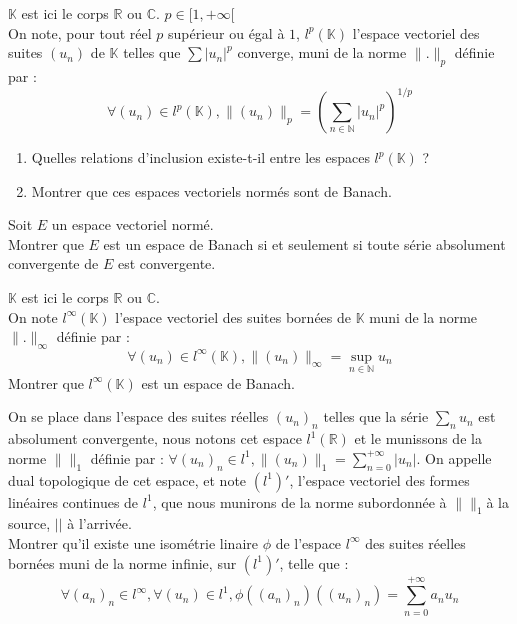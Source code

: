 \begin{exer}
$\mathbb{K}$ est ici le corps $\mathbb{R}$ ou $\mathbb{C}$. $p \in [1,+\infty[$\\
On note, pour tout réel $p$ supérieur ou égal à $1$, $l^{p}(\mathbb{K})$ l'espace vectoriel des suites $(u_n)$ de $\mathbb{K}$ %
telles que $\sum \lvert u_n \rvert^{p}$ converge, muni de la norme $\|.\|_{p}$ définie par :
\[\forall (u_n) \in l^{p}(\mathbb{K}) , \|(u_n)\|_{p} = (\sum_{n \in \mathbb{N}} \lvert u_n \rvert^{p})^{1/p}\]
\begin{enumerate}
\item Quelles relations d'inclusion existe-t-il entre les espaces $l^{p}(\mathbb{K})$ ?
\item Montrer que ces espaces vectoriels normés sont de Banach.
\end{enumerate}
\end{exer}

\begin{exer}
Soit $E$ un espace vectoriel normé.\\
Montrer que $E$ est un espace de Banach si et seulement si toute série absolument convergente de $E$ est convergente.
\end{exer}

\begin{exer}
$\mathbb{K}$ est ici le corps $\mathbb{R}$ ou $\mathbb{C}$.\\
On note $l^{\infty}(\mathbb{K})$ l'espace vectoriel des suites bornées de $\mathbb{K}$ muni de la norme %
$\|.\|_{\infty}$ définie par :
\[\forall (u_n) \in l^{\infty}(\mathbb{K}) , \|(u_n)\|_{\infty} = \sup_{n \in \mathbb{N}} u_n\]
Montrer que $l^{\infty}(\mathbb{K})$ est un espace de Banach.
\end{exer}

\begin{exer}[Dual de $l^1$]
On se place dans l'espace des suites réelles $(u_n)_n$ telles que la série $\sum_n u_n$ est absolument convergente, nous notons cet espace $l^1(\mathbb{R})$ et le munissons de la norme $\| \|_1$ définie par : $\forall (u_n)_n \in l^1 , \| (u_n) \|_1 = \sum\limits_{n=0}^{+\infty} | u_n |$. On appelle dual topologique de cet espace, et note $(l^1)'$, l'espace vectoriel des formes linéaires continues de $l^1$, que nous munirons de la norme subordonnée à $\| \|_1$à la source, $| |$ à l'arrivée.\\
Montrer qu'il existe une isométrie linaire $\phi$ de l'espace $l^{\infty}$ des suites réelles bornées muni de la norme infinie, sur $(l^1)'$, telle que :
\[\forall (a_n)_n \in l^{\infty} , \forall (u_n) \in l^1 , \phi ((a_n)_n) ((u_n)_n) = \sum\limits_{n=0}^{+\infty} a_n u_n\]
\end{exer}

